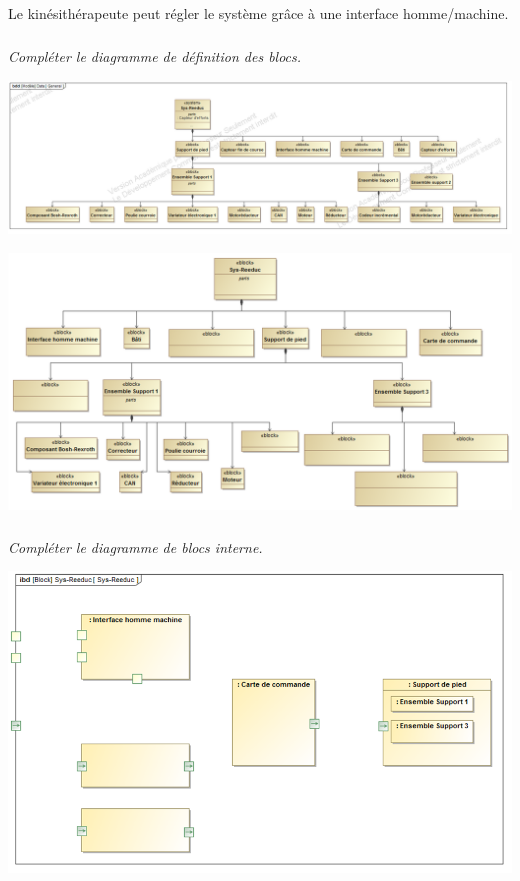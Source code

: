 \documentclass[10pt]{article}
\begin{document}
Le kinésithérapeute peut régler le système grâce à une interface homme/machine.

\fi

\subparagraph{}
\textit{Compléter le diagramme de définition des blocs.}

\ifprof
\begin{corrige}
\begin{center}
\includegraphics[width=\textwidth]{images/BDD_Cor}
\end{center}
\end{corrige}
\else
\begin{center}
\includegraphics[width=\textwidth]{images/bdd}
\end{center}
\fi


\subparagraph{}
\textit{Compléter le diagramme de blocs interne.}

\ifprof
\begin{corrige}
\begin{center}
\end{center}
\end{corrige}
\else
\begin{center}
\includegraphics[width=\textwidth]{images/ibd}
\end{center}
\fi
\end{document}
